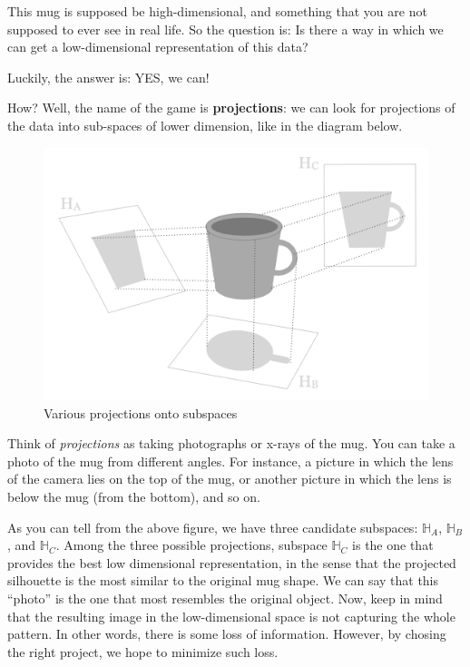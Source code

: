 \documentclass[]{book}
\begin{document}
This mug is supposed be high-dimensional, and something that you are not supposed
to ever see in real life. So the question is: Is there a way in which we can get
a low-dimensional representation of this data?

Luckily, the answer is: YES, we can!

How? Well, the name of the game is \textbf{projections}: we can look for projections
of the data into sub-spaces of lower dimension, like in the diagram below.

\begin{figure}

{\centering \includegraphics[width=0.7\linewidth]{images/pca/mug-projections} 

}

\caption{Various projections onto subspaces}\label{fig:unnamed-chunk-25}
\end{figure}

Think of \emph{projections} as taking photographs or x-rays of the mug. You can take a
photo of the mug from different angles. For instance, a picture in which the lens
of the camera lies on the top of the mug, or another picture in which the lens is
below the mug (from the bottom), and so on.

As you can tell from the above figure, we have three candidate subspaces:
\(\mathbb{H}_A\), \(\mathbb{H}_B\), and \(\mathbb{H}_C\). Among the three possible
projections, subspace \(\mathbb{H}_C\) is the one that provides the best low
dimensional representation, in the sense that the projected silhouette is the
most similar to the original mug shape. We can say that this ``photo'' is the one
that most resembles the original object. Now, keep in mind that the resulting
image in the low-dimensional space is not capturing the whole pattern. In other
words, there is some loss of information. However, by chosing the right project,
we hope to minimize such loss.
\end{document}
